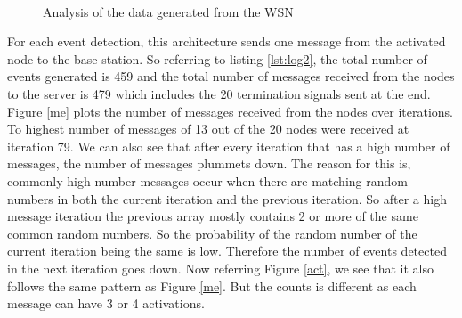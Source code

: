 \documentclass[conference]{IEEEtran}
\begin{document}
		\begin{figure}[!h]
		\centering
		\caption{Analysis of the data generated from the WSN}
		\\
	\end{figure}	

	 For each event detection, this architecture sends one message from the activated node to the base station. So referring to listing \ref{lst:log2}, the total number of events generated is 459 and the total number of messages received from the nodes to the server is 479 which includes the 20 termination signals sent at the end. Figure \ref{me} plots the number of messages received from the nodes over iterations. To highest number of messages of 13 out of the 20 nodes were received at iteration 79. We can also see that after every iteration that has a high number of messages, the number of messages plummets down. The reason for this is, commonly high number messages occur when there are matching random numbers in both the current iteration and the previous iteration. So after a high message iteration the previous array mostly contains 2 or more of the same common random numbers. So the probability of the random number of the current iteration being the same is low. Therefore the number of events detected in the next iteration goes down. Now referring  Figure \ref{act}, we see that it also follows the same pattern as Figure \ref{me}. But the counts is different as each message can have 3 or 4 activations.
	 
\end{document}
